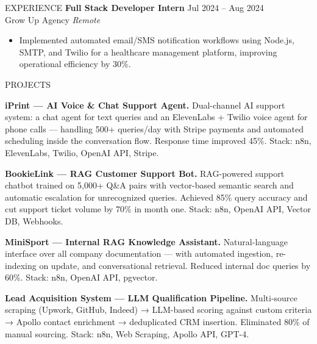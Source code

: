 \documentclass{resume}
\begin{document}
\begin{rSection}{EXPERIENCE}
\textbf{Full Stack Developer Intern} \hfill Jul 2024 -- Aug 2024 \\
Grow Up Agency \hfill \textit{Remote}
\begin{itemize}
    \itemsep -3pt {}
    \item Implemented automated email/SMS notification workflows using Node.js, SMTP, and Twilio for a healthcare management platform, improving operational efficiency by 30\%.
\end{itemize}

\end{rSection}


\begin{rSection}{PROJECTS}
\vspace{-1.25em}

\item \textbf{iPrint — AI Voice \& Chat Support Agent.} {Dual-channel AI support system: a chat agent for text queries and an ElevenLabs + Twilio voice agent for phone calls — handling 500+ queries/day with Stripe payments and automated scheduling inside the conversation flow. Response time improved 45\%. Stack: n8n, ElevenLabs, Twilio, OpenAI API, Stripe.}

\item \textbf{BookieLink — RAG Customer Support Bot.} {RAG-powered support chatbot trained on 5,000+ Q\&A pairs with vector-based semantic search and automatic escalation for unrecognized queries. Achieved 85\% query accuracy and cut support ticket volume by 70\% in month one. Stack: n8n, OpenAI API, Vector DB, Webhooks.}

\item \textbf{MiniSport — Internal RAG Knowledge Assistant.} {Natural-language interface over all company documentation — with automated ingestion, re-indexing on update, and conversational retrieval. Reduced internal doc queries by 60\%. Stack: n8n, OpenAI API, pgvector.}

\item \textbf{Lead Acquisition System — LLM Qualification Pipeline.} {Multi-source scraping (Upwork, GitHub, Indeed) → LLM-based scoring against custom criteria → Apollo contact enrichment → deduplicated CRM insertion. Eliminated 80\% of manual sourcing. Stack: n8n, Web Scraping, Apollo API, GPT-4.}


\end{rSection}
\end{document}
